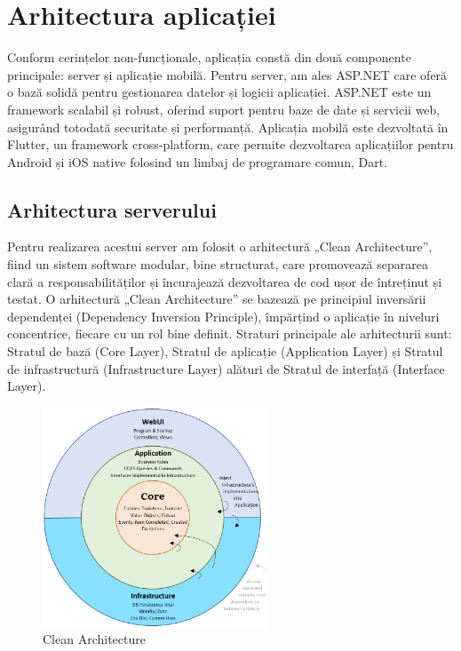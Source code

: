 \chapter{Arhitectura aplicației}

Conform cerințelor non-funcționale, aplicația constă din două componente principale: server și aplicație mobilă. Pentru server, am ales ASP.NET care oferă o bază solidă pentru gestionarea datelor și logicii aplicației. ASP.NET este un framework scalabil și robust, oferind suport pentru baze de date și servicii web, asigurând totodată securitate și performanță. Aplicația mobilă este dezvoltată în Flutter, un framework cross-platform, care permite dezvoltarea aplicațiilor pentru Android și iOS native folosind un limbaj de programare comun, Dart.

\section{Arhitectura serverului}

Pentru realizarea acestui server am folosit o arhitectură „Clean Architecture”, fiind un sistem software modular, bine structurat, care promovează separarea clară a responsabilităților și încurajează dezvoltarea de cod ușor de întreținut și testat. O arhitectură „Clean Architecture” se bazează pe principiul inversării dependenței (Dependency Inversion Principle), împărțind o aplicație în niveluri concentrice, fiecare cu un rol bine definit. Straturi principale ale arhitecturii sunt: Stratul de bază (Core Layer), Stratul de aplicație (Application Layer) și Stratul de infrastructură (Infrastructure Layer) alături de Stratul de interfață (Interface Layer).

\begin{figure}[ht]
    \centering
    \includegraphics[width=0.6\textwidth] {images/clean_architecture.png}
    \caption{Clean Architecture{\cite{clean_architecture}}}
    \label{fig:clean_architecture}
\end{figure}

